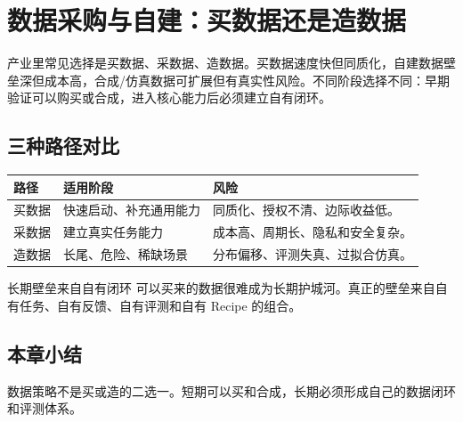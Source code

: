\section{数据采购与自建：买数据还是造数据}

产业里常见选择是买数据、采数据、造数据。买数据速度快但同质化，自建数据壁垒深但成本高，合成/仿真数据可扩展但有真实性风险。不同阶段选择不同：早期验证可以购买或合成，进入核心能力后必须建立自有闭环。

\subsection{三种路径对比}

\noindent\begin{tabularx}{\textwidth}{p{}p{}X}
\toprule
路径 & 适用阶段 & 风险 \\
\midrule
买数据 & 快速启动、补充通用能力 & 同质化、授权不清、边际收益低。 \\
采数据 & 建立真实任务能力 & 成本高、周期长、隐私和安全复杂。 \\
造数据 & 长尾、危险、稀缺场景 & 分布偏移、评测失真、过拟合仿真。 \\
\bottomrule
\end{tabularx}

\begin{importantbox}{长期壁垒来自自有闭环}
可以买来的数据很难成为长期护城河。真正的壁垒来自自有任务、自有反馈、自有评测和自有 Recipe 的组合。
\end{importantbox}

\subsection{本章小结}

数据策略不是买或造的二选一。短期可以买和合成，长期必须形成自己的数据闭环和评测体系。

